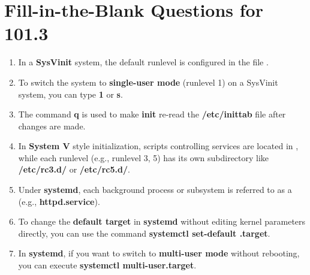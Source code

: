 \documentclass[12pt,a4paper]{report}
\begin{document}
\section*{Fill-in-the-Blank Questions for 101.3}

\begin{enumerate}[1.]

\item In a \textbf{SysVinit} system, the default runlevel is configured in the file \textbf{\underline{\hspace{2cm}}}.

\item To switch the system to \textbf{single-user mode} (runlevel 1) on a SysVinit system, you can type \textbf{\underline{\hspace{2cm}} 1} or \textbf{\underline{\hspace{2cm}} s}.

\item The command \textbf{\underline{\hspace{2cm}} q} is used to make \textbf{init} re-read the \textbf{/etc/inittab} file after changes are made.

\item In \textbf{System V} style initialization, scripts controlling services are located in \textbf{\underline{\hspace{2cm}}}, while each runlevel (e.g., runlevel 3, 5) has its own subdirectory like \textbf{/etc/rc3.d/} or \textbf{/etc/rc5.d/}.

\item Under \textbf{systemd}, each background process or subsystem is referred to as a \textbf{\underline{\hspace{2cm}}} (e.g., \textbf{httpd.service}).

\item To change the \textbf{default target} in \textbf{systemd} without editing kernel parameters directly, you can use the command \textbf{systemctl set-default \underline{\hspace{2cm}}.target}.

\item In \textbf{systemd}, if you want to switch to \textbf{multi-user mode} without rebooting, you can execute \textbf{systemctl \underline{\hspace{2cm}} multi-user.target}.


\end{enumerate}
\end{document}
